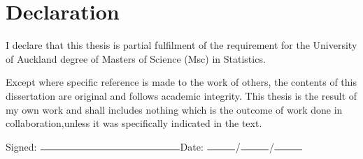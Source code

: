 \chapter*{Declaration}
		
			
I declare that this thesis is partial fulfilment of the requirement for the University of Auckland degree of Masters of Science (Msc) in Statistics. 

\newpara

Except where specific reference is made to the work of others, the contents of this dissertation are original and follows academic integrity. This thesis is the result of my own work and shall includes nothing which is the outcome of work done in collaboration,unless it was specifically indicated in the text.

\newpara
		

\vspace{2cm}
		
	\begin{flushright}
	Signed: $\rule{5cm}{0.15mm}$\hspace{2cm}Date: $\rule{1cm}{0.15mm}$/$\rule{1cm}{0.15mm}$/$\rule{1cm}{0.15mm}$
	\end{flushright}
